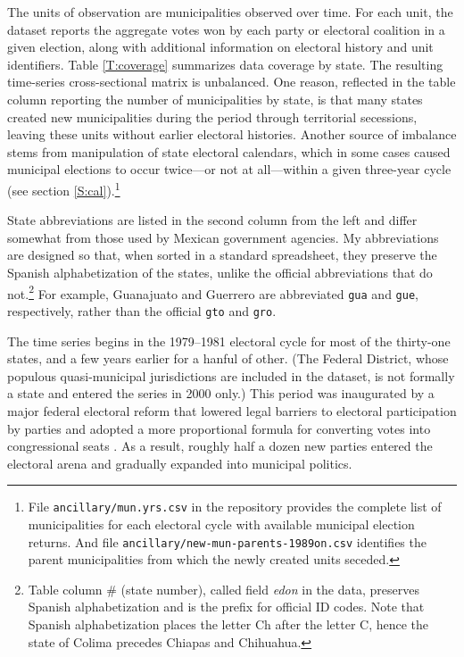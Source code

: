 \documentclass[letter,12pt]{article}
\begin{document}
The units of observation are municipalities observed over time. For each unit, the dataset reports the aggregate votes won by each party or electoral coalition in a given election, along with additional information on electoral history and unit identifiers. Table \ref{T:coverage} summarizes data coverage by state. The resulting time-series cross-sectional matrix is unbalanced. One reason, reflected in the table column reporting the number of municipalities by state, is that many states created new municipalities during the period through territorial secessions, leaving these units without earlier electoral histories. Another source of imbalance stems from manipulation of state electoral calendars, which in some cases caused municipal elections to occur twice---or not at all---within a given three-year cycle (see section \ref{S:cal}).\footnote{File \verb|ancillary/mun.yrs.csv| in the repository provides the complete list of municipalities for each electoral cycle with available municipal election returns. And file \verb|ancillary/new-mun-parents-1989on.csv| identifies the parent municipalities from which the newly created units seceded.}

State abbreviations are listed in the second column from the left and differ somewhat from those used by Mexican government agencies. My abbreviations are designed so that, when sorted in a standard spreadsheet, they preserve the Spanish alphabetization of the states, unlike the official abbreviations that do not.\footnote{Table column \# (state number), called field \emph{edon} in the data, preserves Spanish alphabetization and is the prefix for official ID codes. Note that Spanish alphabetization places the letter Ch after the letter C, hence the state of Colima precedes Chiapas and Chihuahua.} For example, Guanajuato and Guerrero are abbreviated \verb|gua| and \verb|gue|, respectively, rather than the official \verb|gto| and \verb|gro|.

The time series begins in the 1979--1981 electoral cycle for most of the thirty-one states, and a few years earlier for a hanful of other. (The Federal District, whose populous quasi-municipal jurisdictions are included in the dataset, is not formally a state and entered the series in 2000 only.) This period was inaugurated by a major federal electoral reform that lowered legal barriers to electoral participation by parties and adopted a more proportional formula for converting votes into congressional seats \citep[:116]{molinar.1991a}. As a result, roughly half a dozen new parties entered the electoral arena and gradually expanded into municipal politics.  
\end{document}
